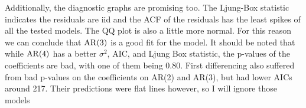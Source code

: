 
\nl Additionally, the diagnostic graphs are promising too. The Ljung-Box statistic indicates the residuals are iid and the ACF of the residuals has the least spikes of all the tested models. The QQ plot is also a little more normal. For this reason we can conclude that $\operatorname{AR}(3)$ is a good fit for the model. It should be noted that while $\operatorname{AR}(4)$ has a better $\sigma^2$, AIC, and Ljung Box statistic, the p-values of the coefficients are bad, with one of them being 0.80. First differencing also suffered from bad p-values on the coefficients on AR(2) and AR(3), but had lower AICs around 217. Their predictions were flat lines however, so I will ignore those models


